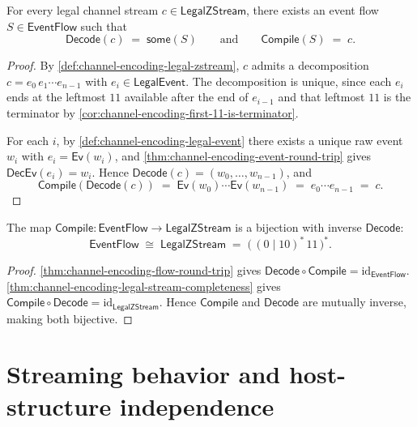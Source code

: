 \begin{theorem}
\label{thm:channel-encoding-legal-stream-completeness}
For every legal channel stream $c \in \mathsf{LegalZStream}$,
there exists an event flow $S \in \mathsf{EventFlow}$ such that
$$
  \mathsf{Decode}(c) \;=\; \mathsf{some}(S)
  \qquad\text{and}\qquad
  \mathsf{Compile}(S) \;=\; c.
$$
\end{theorem}

\begin{proof}
By \autoref{def:channel-encoding-legal-zstream}, $c$ admits a decomposition $c = e_{0}\,e_{1} \cdots e_{n-1}$ with $e_{i} \in \mathsf{LegalEvent}$. The decomposition is unique, since each $e_{i}$ ends at the leftmost $11$ available after the end of $e_{i-1}$ and that leftmost $11$ is the terminator by \autoref{cor:channel-encoding-first-11-is-terminator}.

For each $i$, by \autoref{def:channel-encoding-legal-event} there exists a unique raw event $w_{i}$ with $e_{i} = \mathsf{Ev}(w_{i})$, and \autoref{thm:channel-encoding-event-round-trip} gives $\mathsf{DecEv}(e_{i}) = w_{i}$. Hence $\mathsf{Decode}(c) = (w_{0}, \ldots, w_{n-1})$, and
$$
  \mathsf{Compile}(\mathsf{Decode}(c))
  \;=\;
  \mathsf{Ev}(w_{0}) \cdots \mathsf{Ev}(w_{n-1})
  \;=\;
  e_{0} \cdots e_{n-1}
  \;=\;
  c.
$$
\end{proof}

\begin{corollary}
\label{cor:channel-encoding-bijection}
The map $\mathsf{Compile} \colon \mathsf{EventFlow} \to \mathsf{LegalZStream}$ is a bijection with inverse $\mathsf{Decode}$:
$$
  \mathsf{EventFlow} \;\cong\; \mathsf{LegalZStream}
  \;=\; \big(\, (0 \mid 10)^{*}\,11 \,\big)^{*}.
$$
\end{corollary}

\begin{proof}
\autoref{thm:channel-encoding-flow-round-trip} gives $\mathsf{Decode} \circ \mathsf{Compile} = \mathrm{id}_{\mathsf{EventFlow}}$. \autoref{thm:channel-encoding-legal-stream-completeness} gives $\mathsf{Compile} \circ \mathsf{Decode} = \mathrm{id}_{\mathsf{LegalZStream}}$. Hence $\mathsf{Compile}$ and $\mathsf{Decode}$ are mutually inverse, making both bijective.
\end{proof}

\section{Streaming behavior and host-structure independence}
\label{sec:channel-encoding-streaming-and-host}

